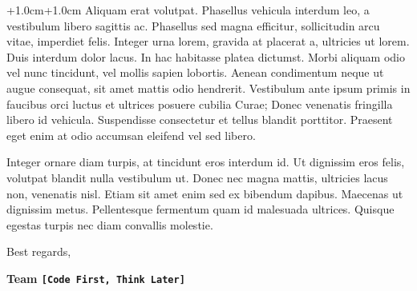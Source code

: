 \documentclass[english]{article}
\newcommand{\code}[1]{\texttt{#1}}
\begin{document}
\begin{adjustwidth*}{+1.0cm}{+1.0cm}
{\large{}Aliquam erat volutpat. Phasellus vehicula interdum leo, a
vestibulum libero sagittis ac. Phasellus sed magna efficitur, sollicitudin
arcu vitae, imperdiet felis. Integer urna lorem, gravida at placerat
a, ultricies ut lorem. Duis interdum dolor lacus. In hac habitasse
platea dictumst. Morbi aliquam odio vel nunc tincidunt, vel mollis
sapien lobortis. Aenean condimentum neque ut augue consequat, sit
amet mattis odio hendrerit. Vestibulum ante ipsum primis in faucibus
orci luctus et ultrices posuere cubilia Curae; Donec venenatis fringilla
libero id vehicula. Suspendisse consectetur et tellus blandit porttitor.
Praesent eget enim at odio accumsan eleifend vel sed libero.}{\large \par}

{\large{}Integer ornare diam turpis, at tincidunt eros interdum id.
Ut dignissim eros felis, volutpat blandit nulla vestibulum ut. Donec
nec magna mattis, ultricies lacus non, venenatis nisl. Etiam sit amet
enim sed ex bibendum dapibus. Maecenas ut dignissim metus. Pellentesque
fermentum quam id malesuada ultrices. Quisque egestas turpis nec diam
convallis molestie.}{\large \par}

\vspace{0.5cm}


\noindent Best regards,

\vspace{0.5cm}


\textbf{Team \code{\textbf{{[}Code First, Think Later{]}}}}

\end{adjustwidth*}

\newpage{}
\end{document}
